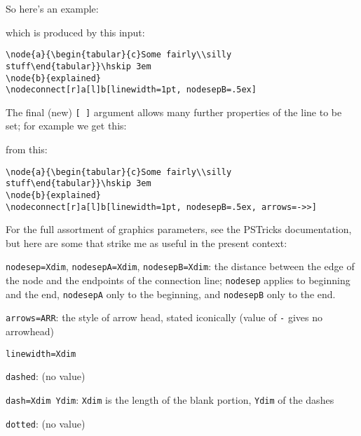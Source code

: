 \documentclass[12pt]{article}
\def\pstricks{PSTricks}
\begin{document}
So here's an example:
which is produced by this input:
\begin{example}
\begin{verbatim}
\node{a}{\begin{tabular}{c}Some fairly\\silly stuff\end{tabular}}\hskip 3em
\node{b}{explained}
\nodeconnect[r]a[l]b[linewidth=1pt, nodesepB=.5ex]
\end{verbatim}
\end{example}
The final (new) {\tt [ ]} argument allows many further properties of the
line to be set; for example we get this:
from this:
\begin{example}
\begin{verbatim}
\node{a}{\begin{tabular}{c}Some fairly\\silly stuff\end{tabular}}\hskip 3em
\node{b}{explained}
\nodeconnect[r]a[l]b[linewidth=1pt, nodesepB=.5ex, arrows=->>]
\end{verbatim}
\end{example}
For the full assortment of graphics parameters, see the {\pstricks}
documentation, but here are some that strike me as useful in the
present context:
\begin{examples}
\item {\tt nodesep=Xdim}, {\tt nodesepA=Xdim}, {\tt nodesepB=Xdim}: the distance between
the edge of the node and the endpoints of the connection line; {\tt nodesep}
applies to beginning and the end, {\tt nodesepA} only to the beginning,
and {\tt nodesepB} only to the end.
\item {\tt arrows=ARR}: the style of arrow head, stated iconically (value of
{\tt -} gives no arrowhead)
\item {\tt linewidth=Xdim}
\item {\tt dashed}: (no value)
\item {\tt dash=Xdim Ydim}: {\tt Xdim} is the length of the blank portion,
{\tt Ydim} of the dashes
\item {\tt dotted}: (no value)
\end{examples}
\end{document}
